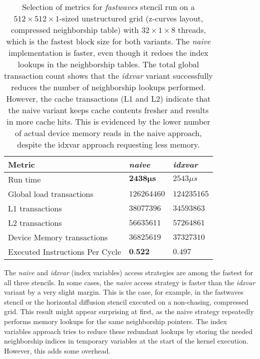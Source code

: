 \begin{table}
    \begin{tabular}{l l l}
        \hline
        \textbf{Metric} & \textbf{\emph{naive}} & \textbf{\emph{idxvar}} \\
        \hline
        \hline
        Run time & $\mathbf{2438\mu s}$ & $2543\mu s$ \\
        Global load transactions & $126264460$ & $124235165$ \\
        L1 transactions & $38077396$ & $34593863$ \\
        L2 transactions & $56635611$ & $57264861$ \\
        Device Memory transactions & $36825619$ & $37327310$ \\
        Executed Instructions Per Cycle & $\textbf{0.522}$ & $0.497$ \\
        \hline
    \end{tabular}
    \caption{\label{tab:fastwaves-naive-idxvar-metrics}Selection of metrics for \emph{fastwaves} stencil run on a $512\times 512\times 1$-sized unstructured grid (z-curves layout, compressed neighborship table) with $32\times 1\times 8$ threads, which is the fastest block size for both variants. The \emph{naive} implementation is faster, even though it redoes the index lookups in the neighborship tables. The total global transaction count shows that the \emph{idxvar} variant successfully reduces the number of neighborship lookups performed. However, the cache transactions (L1 and L2) indicate that the naive variant keeps cache contents fresher and results in more cache hits. This is evidenced by the lower number of actual device memory reads in the naive approach, despite the idxvar approach requesting less memory.}
\end{table}

The \emph{naive} and \emph{idxvar} (index variables) access strategies are among the fastest for all three stencils. In some cases, the \emph{naive} access strategy is faster than the \emph{idxvar} variant by a very slight margin. This is the case, for example, in the fastwaves stencil or the horizontal diffusion stencil executed on a non-chasing, compressed grid. This result might appear surprising at first, as the naive strategy repeatedly performs memory lookups for the same neighborship pointers. The index variables approach tries to reduce these redundant lookups by storing the needed neighborship indices in temporary variables at the start of the kernel execution. However, this adds some overhead.

